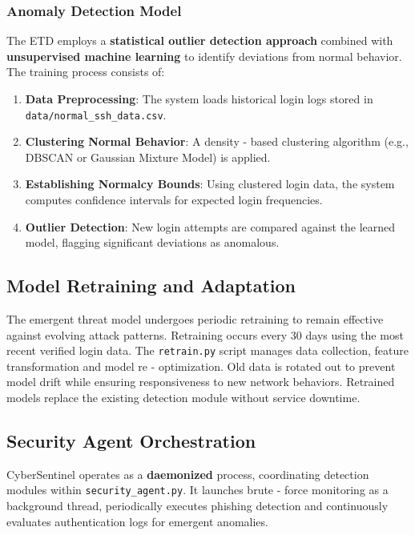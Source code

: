 \documentclass{article}
\begin{document}
\subsubsection{Anomaly Detection Model}
The ETD employs a \textbf{statistical outlier detection approach} combined with \textbf{unsupervised machine learning} to identify deviations from normal behavior. The training process consists of:
\begin{enumerate}
    \item \textbf{Data Preprocessing}: The system loads historical login logs stored in \texttt{data/normal\_ssh\_data.csv}.
    \item \textbf{Clustering Normal Behavior}: A density - based clustering algorithm (e.g., DBSCAN or Gaussian Mixture Model) is applied.
    \item \textbf{Establishing Normalcy Bounds}: Using clustered login data, the system computes confidence intervals for expected login frequencies.
    \item \textbf{Outlier Detection}: New login attempts are compared against the learned model, flagging significant deviations as anomalous.
\end{enumerate}

\subsection{Model Retraining and Adaptation}
The emergent threat model undergoes periodic retraining to remain effective against evolving attack patterns. Retraining occurs every 30 days using the most recent verified login data. The \texttt{retrain.py} script manages data collection, feature transformation and model re - optimization. Old data is rotated out to prevent model drift while ensuring responsiveness to new network behaviors. Retrained models replace the existing detection module without service downtime.

\subsection{Security Agent Orchestration}
CyberSentinel operates as a \textbf{daemonized} process, coordinating detection modules within \texttt{security\_agent.py}. It launches brute - force monitoring as a background thread, periodically executes phishing detection and continuously evaluates authentication logs for emergent anomalies. 
\end{document}
